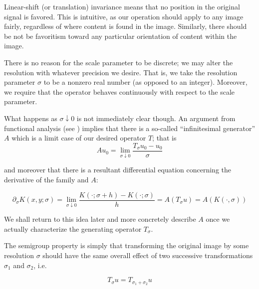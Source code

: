     \begin{axiom}
    	\label{axiom:linear-shift-and-rotation}
    Linear-shift (or translation) invariance means that no position in the original signal is favored.  This is intuitive, as our operation should apply to any image fairly, regardless of where content is found in the image. Similarly, there should be not be favoritism toward any particular orientation of content within the image.
\end{axiom}
    
    \begin{axiom}
    	\label{axiom:continuity} There is no reason for the scale parameter to be discrete; we may alter the resolution with whatever
    precision we desire. That is, we take the resolution
    parameter $\sigma$ to be a nonzero real number
    (as opposed to an integer). Moreover, we require that the operator behaves continuously with respect to the scale parameter.
        \end{axiom}
    What happens as $\sigma \downarrow 0$ is not immediately clear though. 	An argument from functional analysis (see \cite{hille1957functional}) implies that there is a so-called ``infinitesimal generator'' $A$
	which is a limit case of our desired operator $T$; that is
	\begin{equation} \label{eq:infinitesimal-generator}
	A u_0 = \lim_{\sigma \downarrow 0} \frac{T_\sigma u_0 - u_0}{\sigma}
	\end{equation}
	 
	 and moreover that there is a resultant differential equation
	 concerning the derivative of the family and $A$:
	 
	 \begin{equation}
	 \partial_{\sigma} K(x,y;\sigma)
	 = \lim_{\sigma \downarrow 0}
	 \frac{K(\cdot;\sigma+h) - K(\cdot; \sigma)}{h}
	 = A(T_\sigma u) = A(K(\cdot,\sigma))
	 \end{equation}
	 
	 We shall return to this idea later and more concretely describe $A$ once we actually characterize the generating 
	 operator $T_\sigma$.
    
    \begin{axiom} \label{axiom:semigroup}
    The semigroup property is simply that transforming
    the original image by some resolution $\sigma$ should
    have the same overall effect of two successive
    transformations $\sigma_1$ and $\sigma_2$, i.e.
    
    \begin{equation}	
	    T_{\sigma} u = T_{\sigma_1 + \sigma_2} u
    \end{equation}
    \end{axiom}
   

